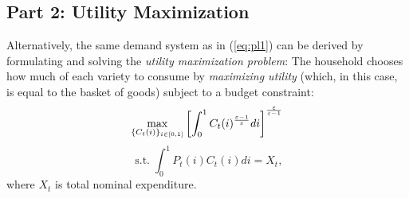 \documentclass[a4paper,11pt]{article}
\begin{document}
\subsection*{Part 2: Utility Maximization}

Alternatively, the same demand system as in (\ref{eq:pl1}) can be derived by formulating and solving the \textit{utility maximization problem}: The household chooses how much of each variety to consume by \textit{maximizing utility} (which, in this case, is equal to the basket of goods) subject to a budget constraint:
\begin{equation*}
\underset{\{C_{t}(i)\}_{i\in [0,1]}}{\max }\left[ \int_{0}^{1}C_{t}(i)^{\frac{\varepsilon -1}{%
\varepsilon }}di\right] ^{\frac{\varepsilon }{\varepsilon -1}}
\end{equation*}
\begin{equation*}
\text{ s.t.}\;\int_{0}^{1}P_{t}(i)C_{t}(i)di=X_{t},
\end{equation*}
where $X_{t}$ is total nominal expenditure.
\end{document}
